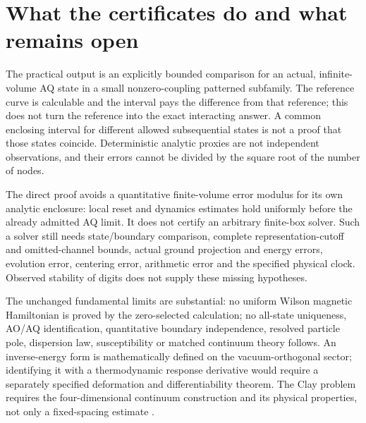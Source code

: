 \section{What the certificates do and what remains open}

The practical output is an explicitly bounded comparison for an actual,
infinite-volume AQ state in a small nonzero-coupling patterned subfamily. The
reference curve is calculable and the interval pays the difference from that
reference; this does not turn the reference into the exact interacting answer.
A common enclosing interval for different allowed subsequential states is not
a proof that those states coincide. Deterministic analytic proxies are not
independent observations, and their errors cannot be divided by the square
root of the number of nodes.

The direct proof avoids a quantitative finite-volume error modulus for its own
analytic enclosure: local reset and dynamics estimates hold uniformly before
the already admitted AQ limit. It does not certify an arbitrary finite-box
solver. Such a solver still needs state/boundary comparison, complete
representation-cutoff and omitted-channel bounds, actual ground projection and
energy errors, evolution error, centering error, arithmetic error and the
specified physical clock. Observed stability of digits does not supply these
missing hypotheses.

The unchanged fundamental limits are substantial: no uniform Wilson magnetic
Hamiltonian is proved by the zero-selected calculation; no all-state uniqueness,
AO/AQ identification, quantitative boundary independence, resolved particle
pole, dispersion law, susceptibility or matched continuum theory follows.
An inverse-energy form is mathematically defined on the vacuum-orthogonal
sector; identifying it with a thermodynamic response derivative would require
a separately specified deformation and differentiability theorem. The Clay
problem requires the four-dimensional continuum construction and its physical
properties, not only a fixed-spacing estimate \cite{clay}.


